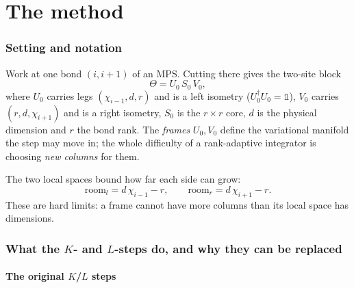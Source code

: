 \documentclass[11pt,a4paper]{article}
\newcommand{\Theb}{\Theta}
\begin{document}
\part{The method}
\label{part:method}

\section{Setting and notation}

Work at one bond $(i, i+1)$ of an MPS. Cutting there gives the two-site block
\begin{equation}
  \Theb = U_0\, S_0\, V_0,
\end{equation}
where $U_0$ carries legs $(\chi_{i-1}, d, r)$ and is a left isometry
($U_0^\dagger U_0 = \mathbb{1}$), $V_0$ carries $(r, d, \chi_{i+1})$ and is a right isometry,
$S_0$ is the $r\times r$ core, $d$ is the physical dimension and $r$ the bond rank. The
\emph{frames} $U_0, V_0$ define the variational manifold the step may move in; the whole
difficulty of a rank-adaptive integrator is choosing \emph{new columns} for them.

The two local spaces bound how far each side can grow:
\begin{equation}
  \mathrm{room}_l = d\,\chi_{i-1} - r,
  \qquad
  \mathrm{room}_r = d\,\chi_{i+1} - r .
  \label{eq:room}
\end{equation}
These are hard limits: a frame cannot have more columns than its local space has dimensions.

\section{What the $K$- and $L$-steps do, and why they can be replaced}
\label{sec:kl}

\subsection{The original $K$/$L$ steps}
\end{document}
